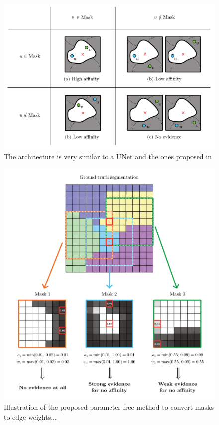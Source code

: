\begin{figure}[t]
\centering
        \includegraphics[width=\textwidth]{./figs/mask_cases.pdf} %
        \caption{The architecture is very similar to a UNet and the ones proposed in \cite{lee2017superhuman,funke2018large}}
    \label{fig:mask_cases}
\end{figure}
\begin{figure}[t]
\centering
        \includegraphics[width=\textwidth]{./figs/mask_average.pdf} %
        \caption{  Illustration of the proposed parameter-free method to convert \maskname masks to edge weights...}
    \label{fig:alg_explained}
\end{figure}

